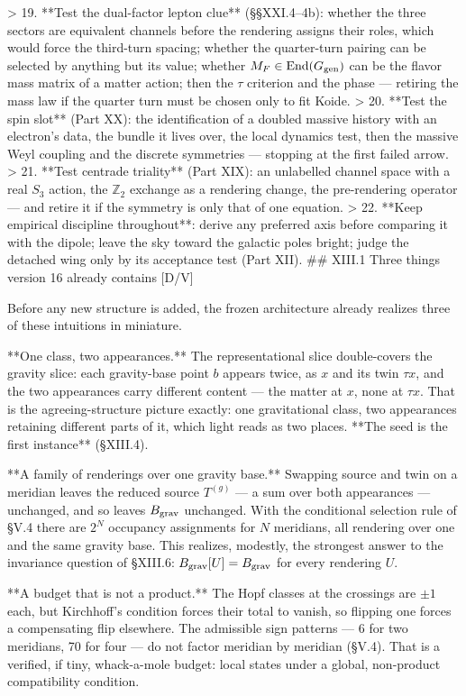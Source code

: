 > 19. **Test the dual-factor lepton clue** (§§XXI.4–4b): whether the three sectors are equivalent channels before the rendering assigns their roles, which would force the third-turn spacing; whether the quarter-turn pairing can be selected by anything but its value; whether $M_F\in{\rm End}(G_{\rm gen})$ can be the flavor mass matrix of a matter action; then the $\tau$ criterion and the phase — retiring the mass law if the quarter turn must be chosen only to fit Koide.
> 20. **Test the spin slot** (Part XX): the identification of a doubled massive history with an electron's data, the bundle it lives over, the local dynamics test, then the massive Weyl coupling and the discrete symmetries — stopping at the first failed arrow.
> 21. **Test centrade triality** (Part XIX): an unlabelled channel space with a real $S_3$ action, the $\mathbb Z_2$ exchange as a rendering change, the pre-rendering operator — and retire it if the symmetry is only that of one equation.
> 22. **Keep empirical discipline throughout**: derive any preferred axis before comparing it with the dipole; leave the sky toward the galactic poles bright; judge the detached wing only by its acceptance test (Part XII).
## XIII.1 Three things version 16 already contains [D/V]

Before any new structure is added, the frozen architecture already realizes three of these intuitions in miniature.

**One class, two appearances.** The representational slice double-covers the gravity slice: each gravity-base point $b$ appears twice, as $x$ and its twin $\tau x$, and the two appearances carry different content — the matter at $x$, none at $\tau x$. That is the agreeing-structure picture exactly: one gravitational class, two appearances retaining different parts of it, which light reads as two places. **The seed is the first instance** (§XIII.4).

**A family of renderings over one gravity base.** Swapping source and twin on a meridian leaves the reduced source $T^{(g)}$ — a sum over both appearances — unchanged, and so leaves $B_{\rm grav}$ unchanged. With the conditional selection rule of §V.4 there are $2^N$ occupancy assignments for $N$ meridians, all rendering over one and the same gravity base. This realizes, modestly, the strongest answer to the invariance question of §XIII.6: $B_{\rm grav}[U] = B_{\rm grav}$ for every rendering $U$.

**A budget that is not a product.** The Hopf classes at the crossings are $\pm1$ each, but Kirchhoff's condition forces their total to vanish, so flipping one forces a compensating flip elsewhere. The admissible sign patterns — 6 for two meridians, 70 for four — do not factor meridian by meridian (§V.4). That is a verified, if tiny, whack-a-mole budget: local states under a global, non-product compatibility condition.

